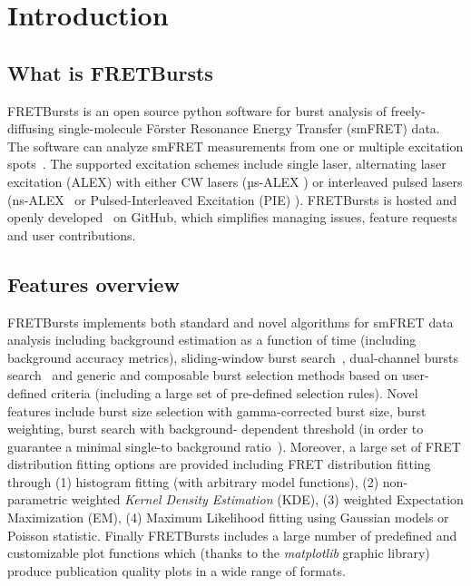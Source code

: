\section{Introduction}

\subsection{What is FRETBursts}

FRETBursts is an open source python software for burst analysis of freely-diffusing
single-molecule Förster Resonance Energy Transfer (smFRET) data.
The software can analyze smFRET measurements
from one or multiple excitation spots~\cite{Ingargiola_2013}. The supported
excitation schemes include single laser, alternating laser excitation (ALEX)
with either CW lasers (µs-ALEX \cite{Kapanidis_2005})
or interleaved pulsed lasers (ns-ALEX~\cite{Laurence_2005} or
Pulsed-Interleaved Excitation (PIE) \cite{M_ller_2005}).
FRETBursts is hosted and openly developed~\cite{Prli__2012} on GitHub, which
simplifies managing issues, feature requests and user contributions.

\subsection{Features overview}

FRETBursts implements both standard and novel algorithms for smFRET data analysis
including background estimation as a function of time (including background accuracy
metrics), sliding-window burst search~\cite{Eggeling_1998}, dual-channel bursts search~\cite{Nir_2006} and
generic and composable burst selection methods based on user-defined criteria
(including a large set of pre-defined selection rules). Novel features include burst size
selection with gamma-corrected burst size, burst weighting, burst search with background-
dependent threshold (in order to guarantee a minimal single-to background ratio~\cite{Michalet_2012}).
Moreover, a large set of FRET distribution fitting options are provided including
FRET distribution fitting through (1) histogram fitting (with arbitrary model functions),
(2)  non-parametric weighted \textit{Kernel Density Estimation} (KDE), (3) weighted
Expectation Maximization (EM), (4) Maximum Likelihood fitting using Gaussian models
or Poisson statistic. Finally FRETBursts includes a large number of
predefined and customizable plot functions which (thanks to the \textit{matplotlib}
graphic library) produce publication quality plots in a wide range of formats.

